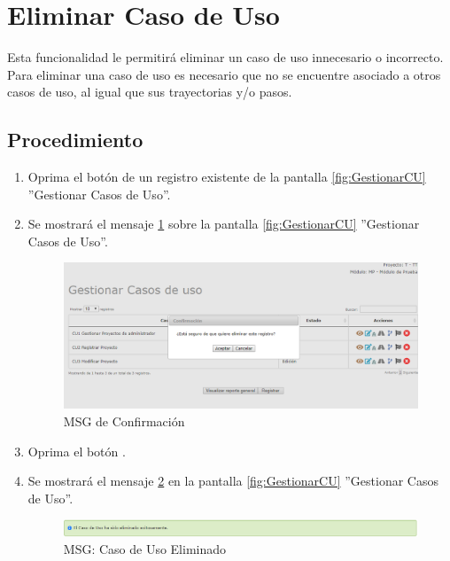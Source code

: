 \hypertarget{cv:eliminarCU}{\section{Eliminar Caso de Uso}} \label{sec:eliminarCU}

	Esta funcionalidad le permitirá eliminar un caso de uso innecesario o incorrecto. Para eliminar una caso de uso es necesario que no se encuentre asociado a otros casos de uso, al igual que sus trayectorias y/o pasos.

		\subsection{Procedimiento}

			\begin{enumerate}
	
			\item Oprima el botón \IUBotonEliminar{} de un registro existente de la pantalla \ref{fig:GestionarCU} ''Gestionar Casos de Uso''.
	
			\item Se mostrará el mensaje \ref{fig:confirmaEliminaCU} sobre la pantalla \ref{fig:GestionarCU} ''Gestionar Casos de Uso''.
			
			\begin{figure}[htbp!]
				\begin{center}
					\includegraphics[scale=0.6]{roles/lider/casosUso/pantallas/IU12-3MSG10}
					\caption{MSG de Confirmación}
					\label{fig:confirmaEliminaCU}
				\end{center}
			\end{figure}
						
			\item Oprima el botón \IUAceptar.
			
			\item Se mostrará el mensaje \ref{fig:CUEliminado} en la pantalla \ref{fig:GestionarCU} ''Gestionar Casos de Uso''.
			
			\begin{figure}[htbp!]
				\begin{center}
					\includegraphics[scale=0.6]{roles/lider/casosUso/pantallas/IU12-3MSG1}
					\caption{MSG: Caso de Uso Eliminado}
					\label{fig:CUEliminado}
				\end{center}
			\end{figure}
			\end{enumerate}